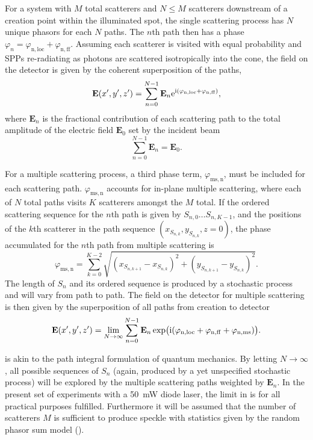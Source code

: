 For a system with $M$ total scatterers and $N \leq M$ scatterers downstream of
a creation point within the illuminated spot, the single scattering process
has $N$ unique phasors for each $N$ paths.  The $n$th path then has a phase
$\varphi_n = \varphi_\mathrm{n,loc}+\varphi_\mathrm{n,ff}$.  Assuming each
scatterer is visited with equal probability and SPPs re-radiating as photons
are scattered isotropically into the cone, the field on the
detector is given by the coherent superposition of the paths,
\begin{equation}
\mathbf{E}(x^\prime,y^\prime,z^\prime) =
\sum_{n=0}^{N-1}
\mathbf{E}_n {\mathrm{e}}^{{\mathrm{i}}{(\varphi_\mathrm{n,loc}+\varphi_\mathrm{n,ff})}},
\end{equation}
where $\mathbf{E}_n$ is the fractional contribution of each scattering path to
the total amplitude of the electric field $\mathbf{E}_0$ set by the incident
beam
\begin{equation}
\sum_{n=0}^{N-1}\mathbf{E}_n = \mathbf{E}_0.
\end{equation}

For a multiple scattering process, a third phase term,
$\varphi_\mathrm{ms,n}$, must be included for each scattering path.
$\varphi_\mathrm{ms,n}$ accounts for in-plane multiple scattering, where each
of $N$ total paths visits $K$ scatterers amongst the $M$ total.  If the
ordered scattering sequence for the $n$th path is given by $S_{n,0} \ldots
S_{n,{K-1}}$, and the positions of the $k$th scatterer in the path sequence
$(x_{S_{n,k}},y_{S_{n,k}},z=0)$, the phase accumulated for the $n$th path from
multiple scattering is
\begin{equation}
\varphi_\mathrm{ms,n}=\sum_{k=0}^{K-2}
\sqrt{{(x_{S_{n,{k+1}}}-x_{S_{n,k}})}^2+{(y_{S_{n,{k+1}}}-y_{S_{n,k}})}^2}.
\end{equation}
The length of $S_n$ and its ordered sequence is produced by a stochastic
process and will vary from path to path.  The field on the detector
for multiple scattering is then given by the superposition of all paths from
creation to detector
\begin{equation}
\mathbf{E}(x^\prime,y^\prime,z^\prime) =
\lim_{N\to\infty}
\sum_{n=0}^{N-1}
\mathbf{E}_n
\exp\!\big({{\mathrm{i}}{(\varphi_\mathrm{n,loc}+\varphi_\mathrm{n,ff}+\varphi_\mathrm{n,ms})}}\big).
\label{eqn:smicromsphase}
\end{equation}

 is akin to the path integral formulation of
quantum mechanics.  By letting $N\to\infty$, all possible sequences of $S_n$
(again, produced by a yet unspecified stochastic process) will be explored by
the multiple scattering paths weighted by $\mathbf{E}_n$.  In the present set
of experiments with a \SI{50}{\milli\watt} diode laser, the limit in
 is for all practical purposes fulfilled.
Furthermore it will be assumed that the number of scatterers $M$ is sufficient
to produce speckle with statistics given by the random phasor sum model
().

